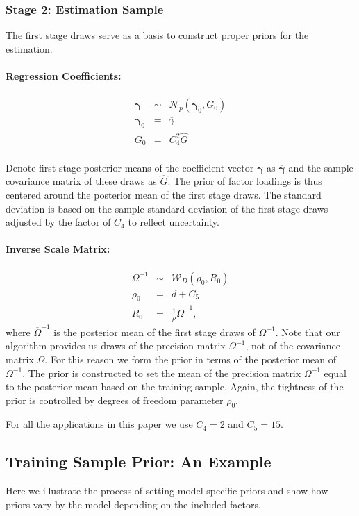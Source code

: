 \subsubsection{Stage 2: Estimation Sample}
The first stage draws serve as a basis to construct proper priors for the estimation.
\paragraph{Regression Coefficients:} 
\begin{eqnarray*}
	\boldsymbol{\gamma} &\sim& \mathcal{N}_{p}\left( \boldsymbol{\gamma}_{0},G_{0}\right) \\
	\boldsymbol{\gamma}_{0} &=& \overline{\gamma} \\ 
	G_{0} &=& C_{4}^{2} \widehat{G}
\end{eqnarray*}\\
Denote first stage posterior means of the coefficient vector $\boldsymbol{\gamma}$ as $\overline{\boldsymbol{\gamma}}$ and the sample covariance matrix of these draws as $\widehat{G}$.
The prior of factor loadings is thus centered around the posterior mean of the first stage draws. 
The standard deviation is based on the sample standard deviation of the first stage draws adjusted by the factor of $C_{4}$ to reflect uncertainty.
\paragraph{Inverse Scale Matrix:}
\begin{eqnarray*}
	\Omega^{-1} &\sim& \mathcal{W}_D\left(\rho_0, R_{0}\right) \\
	\rho_{0} &=& d + C_{5} \\ 
	R_{0} &=& \frac{1}{\rho} \overline{\Omega}^{-1},
\end{eqnarray*} 
where $\overline{\Omega}^{-1}$ is the posterior mean of the first stage draws of $\Omega^{-1}$.
Note that our algorithm provides us draws of the precision matrix $\Omega^{-1}$, not of the covariance matrix $\Omega$. 
For this reason we form the prior in terms of the posterior mean of ${\Omega}^{-1}$. 
The prior is constructed to set the mean of the precision matrix $\Omega^{-1}$ equal to the posterior mean based on the training sample. 
Again, the tightness of the prior is controlled by degrees of freedom parameter $\rho_{0}$. 

For all the applications in this paper we use $C_{4} = 2$ and $C_5 = 15$.

\subsection{Training Sample Prior: An Example}
Here we illustrate the process of setting model specific priors and show how priors vary by the model depending on the included factors.

